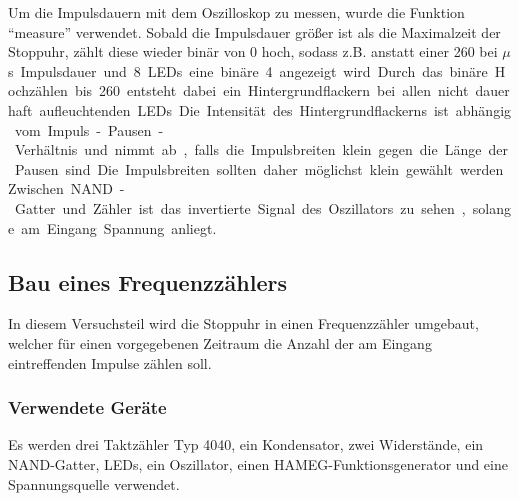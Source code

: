 \documentclass[12pt,a4paper]{article}
\begin{document}
Um die Impulsdauern mit dem Oszilloskop zu messen, wurde die Funktion "`measure"' verwendet. Sobald die Impulsdauer größer ist als die Maximalzeit der Stoppuhr, zählt diese wieder binär von 0 hoch, sodass z.B. anstatt einer 260 bei \unit[260]{$\mu$s} Impulsdauer und 8 LEDs eine binäre 4 angezeigt wird. Durch das binäre Hochzählen bis 260 entsteht dabei ein Hintergrundflackern bei allen nicht dauerhaft aufleuchtenden LEDs. Die Intensität des Hintergrundflackerns ist abhängig vom Impuls-Pausen-Verhältnis und nimmt ab, falls die Impulsbreiten klein gegen die Länge der Pausen sind. Die Impulsbreiten sollten daher möglichst klein gewählt werden. Zwischen NAND-Gatter und Zähler ist das invertierte Signal des Oszillators zu sehen, solange am Eingang Spannung anliegt. 

\subsection{Bau eines Frequenzzählers}
In diesem Versuchsteil wird die Stoppuhr in einen Frequenzzähler umgebaut, welcher für einen vorgegebenen Zeitraum die Anzahl der am Eingang eintreffenden Impulse zählen soll.
\subsubsection*{Verwendete Geräte}
Es werden drei Taktzähler Typ 4040, ein Kondensator, zwei Widerstände, ein NAND-Gatter, LEDs, ein Oszillator, einen HAMEG-Funktionsgenerator und eine Spannungsquelle verwendet.
\end{document}
